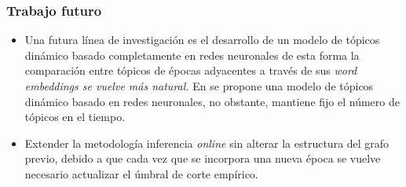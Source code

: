 \documentclass[
	spanish, %
	aspectratio=43, %
	hyperref={pdfencoding=auto,psdextra},
	xcolor={dvipsnames,table,usenames},
]{beamer}
\begin{document}
\begin{frame}
\frametitle{Trabajo futuro}

\begin{itemize}
  \item Una futura línea de investigación es el desarrollo de un modelo de tópicos dinámico basado completamente en redes neuronales de esta forma la comparación entre tópicos de épocas adyacentes a través de sus \textit{word embeddings se vuelve más natural.} En \cite{dieng2019dynamic} se propone una modelo de tópicos dinámico basado en redes neuronales, no obstante, mantiene fijo el número de tópicos en el tiempo.
  \item Extender la metodología inferencia \textit{online} sin alterar la estructura del grafo previo, debido a que cada vez que se incorpora una nueva época se vuelve necesario actualizar el úmbral de corte empírico.
\end{itemize}

\end{frame}


\begin{frame}[allowframebreaks]\normalsize
\frametitle{\namereferences}

\end{frame}
\end{document}
